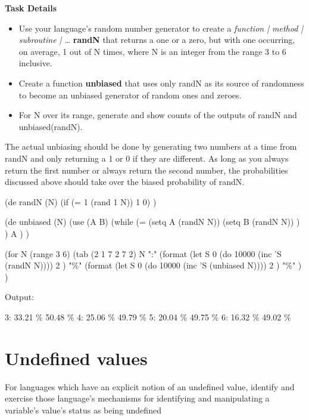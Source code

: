 \textbf{Task Details}

\begin{itemize}
\item Use your language's random number generator to create a
  \emph{function | method | subroutine | \ldots{}} \textbf{randN} that
  returns a one or a zero, but with one occurring, on average, 1 out
  of N times, where N is an integer from the range 3 to 6 inclusive.
\item
  Create a function \textbf{unbiased} that uses only randN as its source
  of randomness to become an unbiased generator of random ones and
  zeroes.
\item
  For N over its range, generate and show counts of the outputs of randN
  and unbiased(randN).
\end{itemize}

The actual unbiasing should be done by generating two numbers at a time
from randN and only returning a 1 or 0 if they are different. As long as
you always return the first number or always return the second number,
the probabilities discussed above should take over the biased
probability of randN.



\begin{wideverbatim}

(de randN (N)
   (if (= 1 (rand 1 N)) 1 0) )

(de unbiased (N)
   (use (A B)
      (while
         (=
            (setq A (randN N))
            (setq B (randN N)) ) )
      A ) )

(for N (range 3 6)
   (tab (2 1 7 2 7 2)
      N ":"
      (format
         (let S 0 (do 10000 (inc 'S (randN N))))
         2 )
      "\%"
      (format
         (let S 0 (do 10000 (inc 'S (unbiased N))))
         2 )
      "\%" ) )

Output:

 3:  33.21 \%  50.48 \%
 4:  25.06 \%  49.79 \%
 5:  20.04 \%  49.75 \%
 6:  16.32 \%  49.02 \%

\end{wideverbatim}

\pagebreak{}
\section*{Undefined values}


For languages which have an explicit notion of an undefined value,
identify and exercise those language's mechanisms for identifying and
manipulating a variable's value's status as being undefined

